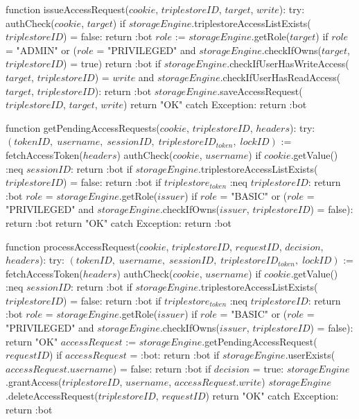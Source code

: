 function issueAccessRequest($cookie$, $triplestoreID$, $target$, $write$):
    try:
        authCheck($cookie$, $target$)
        if $storageEngine$.triplestoreAccessListExists($triplestoreID$) = false:
            return :bot
        $role$ := $storageEngine$.getRole($target$)
        if $role$ = "ADMIN" or ($role$ = "PRIVILEGED" and $storageEngine$.checkIfOwns($target$, $triplestoreID$) = true)
            return :bot
        if $storageEngine$.checkIfUserHasWriteAccess($target$, $triplestoreID$) = $write$ and $storageEngine$.checkIfUserHasReadAccess($target$, $triplestoreID$):
            return :bot
        $storageEngine$.saveAccessRequest($triplestoreID$, $target$, $write$)
        return "OK"
    catch Exception: 
       return :bot
    
function getPendingAccessRequests($cookie$, $triplestoreID$, $headers$):
    try:
        $(tokenID, \; username, \; sessionID, \; triplestoreID_{token}, \; lockID)$ := fetchAccessToken($headers$)
        authCheck($cookie$, $username$)
        if $cookie$.getValue() :neq $sessionID$: 
            return :bot
        if $storageEngine$.triplestoreAccessListExists($triplestoreID$) = false:
            return :bot
        if $triplestore_{token}$ :neq $triplestoreID$:
            return :bot
        $role$ = $storageEngine$.getRole($issuer$)
        if $role$ = "BASIC" or ($role$ = "PRIVILEGED" and $storageEngine$.checkIfOwns($issuer$, $triplestoreID$) = false):
            return :bot
        return "OK"
    catch Exception: 
       return :bot
    
function processAccessRequest($cookie$, $triplestoreID$, $requestID$, $decision$, $headers$):
    try:
        $(tokenID, \; username, \; sessionID, \; triplestoreID_{token}, \; lockID)$ := fetchAccessToken($headers$)
        authCheck($cookie$, $username$)
        if $cookie$.getValue() :neq $sessionID$: 
            return :bot
        if $storageEngine$.triplestoreAccessListExists($triplestoreID$) = false:
            return :bot
        if $triplestore_{token}$ :neq $triplestoreID$:
            return :bot
        $role$ = $storageEngine$.getRole($issuer$)
        if $role$ = "BASIC" or ($role$ = "PRIVILEGED" and $storageEngine$.checkIfOwns($issuer$, $triplestoreID$) = false):
            return "OK"
        $accessRequest$ := $storageEngine$.getPendingAccessRequest($requestID$)
        if $accessRequest$ = :bot:
            return :bot
        if $storageEngine$.userExists($accessRequest$.$username$) = false:
            return :bot
        if $decision$ = true:
            $storageEngine$.grantAccess($triplestoreID$, $username$, $accessRequest$.$write$)
        $storageEngine$.deleteAccessRequest($triplestoreID$, $requestID$)
        return "OK"
    catch Exception: 
       return :bot